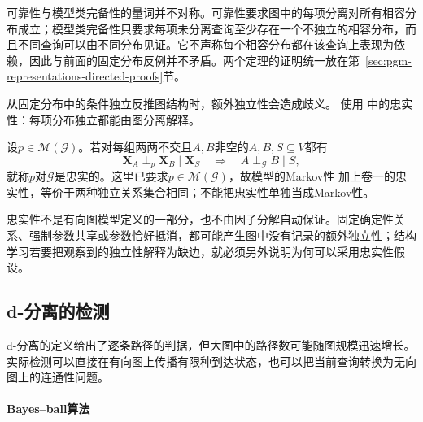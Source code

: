 可靠性与模型类完备性的量词并不对称。可靠性要求图中的每项分离对所有相容分布成立；模型类完备性只要求每项未分离查询至少存在一个不独立的相容分布，而且不同查询可以由不同分布见证。它不声称每个相容分布都在该查询上表现为依赖，因此与前面的固定分布反例并不矛盾。两个定理的证明统一放在第~\ref{sec:pgm-representations-directed-proofs}节。

从固定分布中的条件独立反推图结构时，额外独立性会造成歧义。
使用
中的忠实性：每项分布独立都能由图分离解释。

\begin{definition}[忠实性]
  \label{def:pgm-directed-faithfulness}
  设$p\in\mathcal{M}(\mathcal{G})$。若对每组两两不交且$A,B$非空的$A,B,S\subseteq V$都有
  \[
    \bm{X}_A\perp_p\bm{X}_B\mid\bm{X}_S
    \quad\Longrightarrow\quad
    A\perp_{\mathcal{G}}B\mid S,
  \]
  就称$p$对$\mathcal{G}$是忠实的。这里已要求$p\in\mathcal M(\mathcal G)$，故模型的Markov性
  加上卷一的忠实性，等价于两种独立关系集合相同；不能把忠实性单独当成Markov性。
\end{definition}

忠实性不是有向图模型定义的一部分，也不由因子分解自动保证。固定确定性关系、强制参数共享或参数恰好抵消，都可能产生图中没有记录的额外独立性；结构学习若要把观察到的独立性解释为缺边，就必须另外说明为何可以采用忠实性假设。

\subsection{d-分离的检测}
\label{sec:pgm-directed-d-separation-testing}

d-分离的定义给出了逐条路径的判据，但大图中的路径数可能随图规模迅速增长。实际检测可以直接在有向图上传播有限种到达状态，也可以把当前查询转换为无向图上的连通性问题。

\begingroup
\let\subsubsection\paragraph

\subsubsection{Bayes--ball算法}
\label{sec:pgm-directed-bayes-ball}

